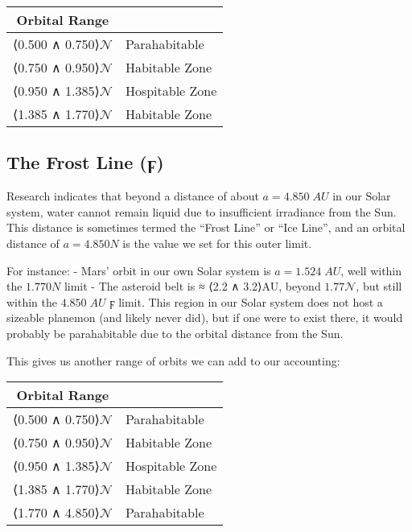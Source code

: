 \documentclass[
  letterpaper,
]{book}
\begin{document}
\begin{longtable}[]{@{}cl@{}}
\toprule\noalign{}
Orbital Range & \\
\midrule\noalign{}
\endhead
\bottomrule\noalign{}
\endlastfoot
⟨0.500 ∧ 0.750⟩\(\mathcal{N}\) & Parahabitable \\
⟨0.750 ∧ 0.950⟩\(\mathcal{N}\) & Habitable Zone \\
⟨0.950 ∧ 1.385⟩\(\mathcal{N}\) & Hospitable Zone \\
⟨1.385 ∧ 1.770⟩\(\mathcal{N}\) & Habitable Zone \\
\end{longtable}

\subsection{The Frost Line (ϝ)}\label{the-frost-line-ux3dd}

Research indicates that beyond a distance of about \(a = 4.850\;AU\) in
our Solar system, water cannot remain liquid due to insufficient
irradiance from the Sun. This distance is sometimes termed the ``Frost
Line'' or ``Ice Line'', and an orbital distance of \(a = 4.850N\) is the
value we set for this outer limit.

For instance: - Mars' orbit in our own Solar system is
\(a = 1.524\;AU\), well within the \(1.770N\) limit - The asteroid belt
is ≈ ⟨2.2 ∧ 3.2⟩AU, beyond \(1.77\mathcal{N}\), but still within the
\(4.850\;AU\) ϝ limit. This region in our Solar system does not host a
sizeable planemon (and likely never did), but if one were to exist
there, it would probably be parahabitable due to the orbital distance
from the Sun.

This gives us another range of orbits we can add to our accounting:

\begin{longtable}[]{@{}cl@{}}
\toprule\noalign{}
Orbital Range & \\
\midrule\noalign{}
\endhead
\bottomrule\noalign{}
\endlastfoot
⟨0.500 ∧ 0.750⟩\(\mathcal{N}\) & Parahabitable \\
⟨0.750 ∧ 0.950⟩\(\mathcal{N}\) & Habitable Zone \\
⟨0.950 ∧ 1.385⟩\(\mathcal{N}\) & Hospitable Zone \\
⟨1.385 ∧ 1.770⟩\(\mathcal{N}\) & Habitable Zone \\
⟨1.770 ∧ 4.850⟩\(\mathcal{N}\) & Parahabitable \\
\end{longtable}
\end{document}
